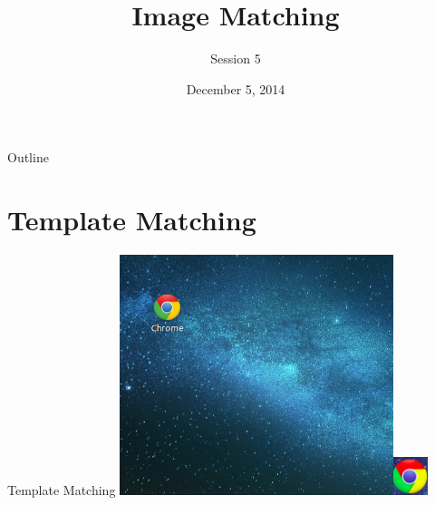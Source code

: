 \documentclass{beamer}
\title{Image Matching}
\subtitle{Session 5}
\institute[Computer Vision Group]
{
  Computer Vision Group\\
  IIT Madras
}
\date{December 5, 2014}
\begin{document}
\begin{frame}
  \titlepage
\end{frame}

\begin{frame}{Outline}
  \tableofcontents
\end{frame}

\section{Template Matching}

\begin{frame}{Template Matching}
    \centering
        \includegraphics[width=80mm]{images/p1.png}\includegraphics[width=10mm]{images/template2.png}

\end{frame}
\end{document}
